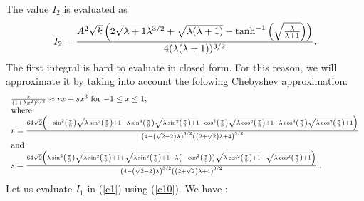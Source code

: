\documentclass{ws-ijbc}
\begin{document}
The value $I_{2}$ is evaluated as 
\begin{equation}
I_{2}=\frac{A^{2}\sqrt{k}\left( 2\sqrt{\lambda +1}\lambda ^{3/2}+\sqrt{%
\lambda (\lambda +1)}-\tanh ^{-1}\left( \sqrt{\frac{\lambda }{\lambda +1}}%
\right) \right) }{4(\lambda (\lambda +1))^{3/2}}.  \label{c9}
\end{equation}%
The first integral is hard to evaluate in closed form. For this reason, we
will approximate it by taking into account the folowing Chebyshev
approximation:%
\begin{equation}
\begin{tabular}{l}
$\frac{x}{(1+\lambda x^{2})^{3/2}}\approx rx+sx^{3}$ for $-1\leq x\leq 1,$
\\ 
where \\ 
$r=\frac{64\sqrt{2}\left( -\sin ^{2}\left( \frac{\pi }{8}\right) \sqrt{%
\lambda \sin ^{2}\left( \frac{\pi }{8}\right) +1}-\lambda \sin ^{4}\left( 
\frac{\pi }{8}\right) \sqrt{\lambda \sin ^{2}\left( \frac{\pi }{8}\right) +1}%
+\cos ^{2}\left( \frac{\pi }{8}\right) \sqrt{\lambda \cos ^{2}\left( \frac{%
\pi }{8}\right) +1}+\lambda \cos ^{4}\left( \frac{\pi }{8}\right) \sqrt{%
\lambda \cos ^{2}\left( \frac{\pi }{8}\right) +1}\right) }{\left( 4-\left( 
\sqrt{2}-2\right) \lambda \right) ^{3/2}\left( \left( 2+\sqrt{2}\right)
\lambda +4\right) ^{3/2}}$ \\ 
and \\ 
$s=\frac{64\sqrt{2}\left( \lambda \sin ^{2}\left( \frac{\pi }{8}\right) 
\sqrt{\lambda \sin ^{2}\left( \frac{\pi }{8}\right) +1}+\sqrt{\lambda \sin
^{2}\left( \frac{\pi }{8}\right) +1}+\lambda \left( -\cos ^{2}\left( \frac{%
\pi }{8}\right) \right) \sqrt{\lambda \cos ^{2}\left( \frac{\pi }{8}\right)
+1}-\sqrt{\lambda \cos ^{2}\left( \frac{\pi }{8}\right) +1}\right) }{\left(
4-\left( \sqrt{2}-2\right) \lambda \right) ^{3/2}\left( \left( 2+\sqrt{2}%
\right) \lambda +4\right) ^{3/2}}..$%
\end{tabular}
\label{c10}
\end{equation}%
Let us evaluate $I_{1}$ in (\ref{c1}) using (\ref{c10}). We have :%
\end{document}
